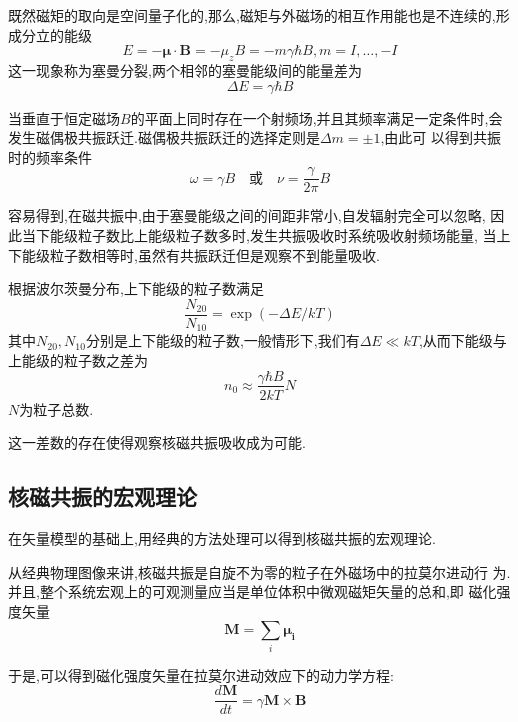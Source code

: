 \documentclass[aps,pre,12pt,preprint,onecolumn,showpacs,showkeys]{revtex4-1}
\begin{document}
既然磁矩的取向是空间量子化的,那么,磁矩与外磁场的相互作用能也是不连续的,形
成分立的能级
\begin{equation}
E = - \bm{\mu} \cdot \bm{B} = -\mu_zB = -m\gamma\hbar B , m = I,
\dots, -I
\end{equation}
这一现象称为塞曼分裂,两个相邻的塞曼能级间的能量差为
\begin{equation}
\Delta E = \gamma \hbar B
\end{equation}

当垂直于恒定磁场$B$的平面上同时存在一个射频场,并且其频率满足一定条件时,会
发生磁偶极共振跃迁.磁偶极共振跃迁的选择定则是$\Delta m = \pm 1$,由此可
以得到共振时的频率条件
\begin{equation}
\omega = \gamma B \text{~~~或~~~} \nu=\frac{\gamma}{2\pi}B
\end{equation}

容易得到,在磁共振中,由于塞曼能级之间的间距非常小,自发辐射完全可以忽略,
因此当下能级粒子数比上能级粒子数多时,发生共振吸收时系统吸收射频场能量,
当上下能级粒子数相等时,虽然有共振跃迁但是观察不到能量吸收.

根据波尔茨曼分布,上下能级的粒子数满足
\begin{equation}
\frac{N_{20}}{N_{10}} = \exp (-\Delta E/kT)
\end{equation}
其中$N_{20},N_{10}$分别是上下能级的粒子数,一般情形下,我们有$\Delta E
\ll kT$,从而下能级与上能级的粒子数之差为
\begin{equation}
n_0 \approx \frac{\gamma\hbar B}{2kT}N
\end{equation}
$N$为粒子总数.

这一差数的存在使得观察核磁共振吸收成为可能.


\subsection{核磁共振的宏观理论}

在矢量模型的基础上,用经典的方法处理可以得到核磁共振的宏观理论.

从经典物理图像来讲,核磁共振是自旋不为零的粒子在外磁场中的拉莫尔进动行
为.并且,整个系统宏观上的可观测量应当是单位体积中微观磁矩矢量的总和,即
磁化强度矢量
\begin{equation}
\bm{M} = \sum_i\bm{\mu_i}
\end{equation}


于是,可以得到磁化强度矢量在拉莫尔进动效应下的动力学方程:
\begin{equation}
\frac{d\bm{M}}{dt} = \gamma\bm{M} \times \bm{B}
\end{equation}
\end{document}
